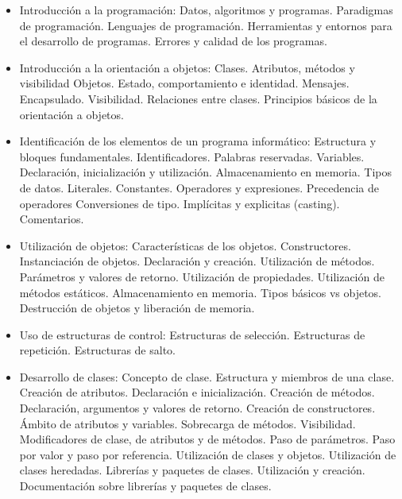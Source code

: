 \begin{itemize}[itemsep=0.1em, topsep=0.1em]
\item Introducción a la programación:
\subitem Datos, algoritmos y programas.
\subitem Paradigmas de programación.
\subitem Lenguajes de programación.
\subitem Herramientas y entornos para el desarrollo de programas.
\subitem Errores y calidad de los programas.
\item Introducción a la orientación a objetos:
\subitem Clases. Atributos, métodos y visibilidad
\subitem Objetos. Estado, comportamiento e identidad. Mensajes.
\subitem Encapsulado. Visibilidad.
\subitem Relaciones entre clases.
\subitem Principios básicos de la orientación a objetos.
\item Identificación de los elementos de un programa informático:
\subitem Estructura y bloques fundamentales.
\subitem Identificadores.
\subitem Palabras reservadas.
\subitem Variables. Declaración, inicialización y utilización. Almacenamiento en memoria.
\subitem Tipos de datos.
\subitem Literales.
\subitem Constantes.
\subitem Operadores y expresiones. Precedencia de operadores
\subitem Conversiones de tipo. Implícitas y explicitas (casting).
\subitem Comentarios.
\item Utilización de objetos:
\subitem Características de los objetos.
\subitem Constructores.
\subitem Instanciación de objetos. Declaración y creación.
\subitem Utilización de métodos. Parámetros y valores de retorno.
\subitem Utilización de propiedades.
\subitem Utilización de métodos estáticos.
\subitem Almacenamiento en memoria. Tipos básicos vs objetos.
\subitem Destrucción de objetos y liberación de memoria.
\item Uso de estructuras de control:
\subitem Estructuras de selección.
\subitem Estructuras de repetición.
\subitem Estructuras de salto.
\item Desarrollo de clases:
\subitem Concepto de clase.
\subitem Estructura y miembros de una clase.
\subitem Creación de atributos. Declaración e inicialización.
\subitem Creación de métodos. Declaración, argumentos y valores de retorno.
\subitem Creación de constructores.
\subitem Ámbito de atributos y variables.
\subitem Sobrecarga de métodos.
\subitem Visibilidad. Modificadores de clase, de atributos y de métodos.
\subitem Paso de parámetros. Paso por valor y paso por referencia.
\subitem Utilización de clases y objetos.
\subitem Utilización de clases heredadas.
\subitem Librerías y paquetes de clases. Utilización y creación.
\subitem Documentación sobre librerías y paquetes de clases.

\end{itemize}

